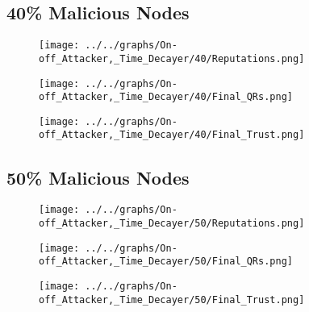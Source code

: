 \begin{minipage}[t]{0.49\columnwidth}
\subsection*{40\% Malicious Nodes}
    \begin{figure}[H]
        \centering
        \texttt{[image: ../../graphs/On-off\_Attacker,\_Time\_Decayer/40/Reputations.png]}
    \end{figure}
    \begin{figure}[H]
        \centering
        \texttt{[image: ../../graphs/On-off\_Attacker,\_Time\_Decayer/40/Final\_QRs.png]}
    \end{figure}
\end{minipage}
\begin{minipage}[t]{0.49\columnwidth}
    \begin{figure}[H]
        \centering
        \texttt{[image: ../../graphs/On-off\_Attacker,\_Time\_Decayer/40/Final\_Trust.png]}
    \end{figure}
\end{minipage}

\begin{minipage}[t]{0.49\columnwidth}
\subsection*{50\% Malicious Nodes}
    \begin{figure}[H]
        \centering
        \texttt{[image: ../../graphs/On-off\_Attacker,\_Time\_Decayer/50/Reputations.png]}
    \end{figure}
    \begin{figure}[H]
        \centering
        \texttt{[image: ../../graphs/On-off\_Attacker,\_Time\_Decayer/50/Final\_QRs.png]}
    \end{figure}
\end{minipage}
\begin{minipage}[t]{0.49\columnwidth}
    \begin{figure}[H]
        \centering
        \texttt{[image: ../../graphs/On-off\_Attacker,\_Time\_Decayer/50/Final\_Trust.png]}
    \end{figure}
\end{minipage}

